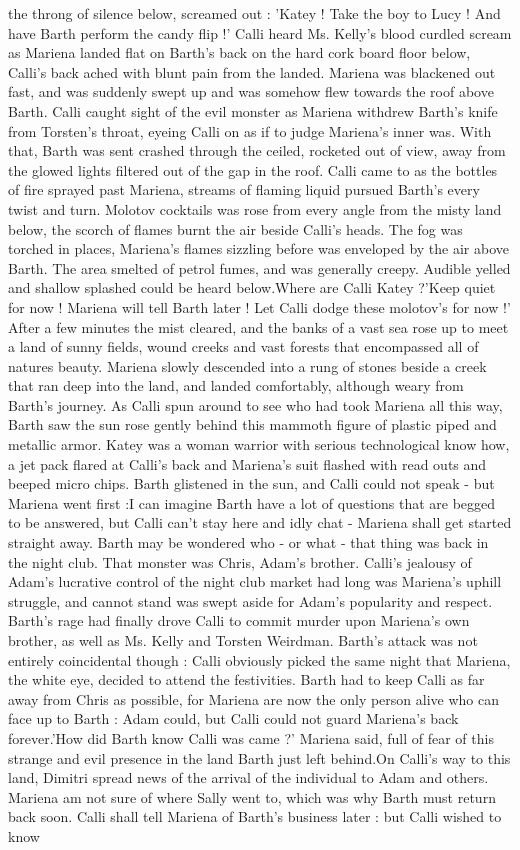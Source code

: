 \documentclass[12pt]{book}
\begin{document}
the throng of silence below, screamed out : 'Katey ! Take the boy to Lucy ! And have Barth perform the candy flip !' Calli heard Ms. Kelly's blood curdled scream as Mariena landed flat on Barth's back on the hard cork board floor below, Calli's back ached with blunt pain from the landed. Mariena was blackened out fast, and was suddenly swept up and was somehow flew towards the roof above Barth. Calli caught sight of the evil monster as Mariena withdrew Barth's knife from Torsten's throat, eyeing Calli on as if to judge Mariena's inner was. With that, Barth was sent crashed through the ceiled, rocketed out of view, away from the glowed lights filtered out of the gap in the roof. Calli came to as the bottles of fire sprayed past Mariena, streams of flaming liquid pursued Barth's every twist and turn. Molotov cocktails was rose from every angle from the misty land below, the scorch of flames burnt the air beside Calli's heads. The fog was torched in places, Mariena's flames sizzling before was enveloped by the air above Barth. The area smelted of petrol fumes, and was generally creepy. Audible yelled and shallow splashed could be heard below.Where are Calli Katey ?'Keep quiet for now ! Mariena will tell Barth later ! Let Calli dodge these molotov's for now !' After a few minutes the mist cleared, and the banks of a vast sea rose up to meet a land of sunny fields, wound creeks and vast forests that encompassed all of natures beauty. Mariena slowly descended into a rung of stones beside a creek that ran deep into the land, and landed comfortably, although weary from Barth's journey. As Calli spun around to see who had took Mariena all this way, Barth saw the sun rose gently behind this mammoth figure of plastic piped and metallic armor. Katey was a woman warrior with serious technological know how, a jet pack flared at Calli's back and Mariena's suit flashed with read outs and beeped micro chips. Barth glistened in the sun, and Calli could not speak - but Mariena went first :I can imagine Barth have a lot of questions that are begged to be answered, but Calli can't stay here and idly chat - Mariena shall get started straight away. Barth may be wondered who - or what - that thing was back in the night club. That monster was Chris, Adam's brother. Calli's jealousy of Adam's lucrative control of the night club market had long was Mariena's uphill struggle, and cannot stand was swept aside for Adam's popularity and respect. Barth's rage had finally drove Calli to commit murder upon Mariena's own brother, as well as Ms. Kelly and Torsten Weirdman. Barth's attack was not entirely coincidental though : Calli obviously picked the same night that Mariena, the white eye, decided to attend the festivities. Barth had to keep Calli as far away from Chris as possible, for Mariena are now the only person alive who can face up to Barth : Adam could, but Calli could not guard Mariena's back forever.'How did Barth know Calli was came ?' Mariena said, full of fear of this strange and evil presence in the land Barth just left behind.On Calli's way to this land, Dimitri spread news of the arrival of the individual to Adam and others. Mariena am not sure of where Sally went to, which was why Barth must return back soon. Calli shall tell Mariena of Barth's business later : but Calli wished to know 
\end{document}
